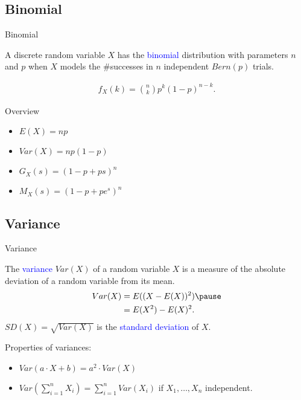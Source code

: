 \documentclass{beamer}
\def\padding{\vspace{0.5cm}}
\def\b{\textcolor{blue}}
\begin{document}
\subsection{Binomial}
\begin{frame}{Binomial}
    \begin{definition}
        A discrete random variable $X$ has the \b{binomial} distribution with parameters $n$ and $p$ when $X$ models the \#successes in $n$ independent $Bern(p)$ trials.
    \end{definition}\pause
    \begin{align*}
        f_X(k) = {n \choose k} p^k (1 - p)^{n-k}.
    \end{align*}\pause
    \begin{exampleblock}{Overview}
        \begin{itemize}
            \item $E(X) = n p$\pause
            \item $Var(X) = n p (1 - p)$
            \item $G_X(s) = (1 - p + p s)^n$
            \item $M_X(s) = (1 - p + p e^s)^n$
        \end{itemize}
    \end{exampleblock}
\end{frame}

\subsection{Variance}
\begin{frame}{Variance}
    \begin{definition}
        The \b{variance} $Var(X)$ of a random variable $X$ is a measure of the absolute deviation of a random variable from its mean.
        \begin{align*}
            Var(X) &= E((X - E(X))^2)\pause \\
                   &= E(X^2) - E(X)^2.
        \end{align*}\pause
        $SD(X) = \sqrt{Var(X)}$ is the \b{standard deviation} of $X$.
    \end{definition}\pause\par\padding
    Properties of variances:\pause
    \begin{itemize}
        \item $Var(a \cdot X + b) = a^2 \cdot Var(X)$\pause
        \item $Var(\sum_{i=1}^n X_i) = \sum_{i=1}^n Var(X_i)$ if $X_1, \dots, X_n$ independent.
    \end{itemize}
\end{frame}
\end{document}
